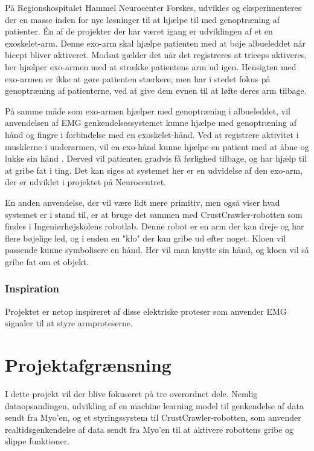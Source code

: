 På Regionshospitalet Hammel Neurocenter Forskes, udvikles og eksperimenteres der en masse inden for nye løsninger til at hjælpe til med genoptræning af patienter. Én af de projekter der har været igang er udviklingen af et en exoskelet-arm. Denne exo-arm skal hjælpe patienten med at bøje albueleddet når bicept bliver aktiveret. Modsat gælder det når det registreres at triceps aktiveres, her hjælper exo-armen med at strække patientens arm ud igen. Hensigten med exo-armen er ikke at gøre patienten stærkere, men har i stedet fokus på genoptræning af patienterne, ved at give dem evnen til at løfte deres arm tilbage.

På samme måde som exo-armen hjælper med genoptræning i albueleddet, vil anvendelsen af EMG genkendelsessystemet kunne hjælpe med genoptræning af hånd og fingre i forbindelse med en exoskelet-hånd. Ved at registrere aktivitet i musklerne i underarmen, vil en exo-hånd kunne hjælpe en patient med at åbne og lukke sin hånd . Derved vil patienten gradvis få førlighed tilbage, og har hjælp til at gribe fat i ting. Det kan siges at systemet her er en udvidelse af den exo-arm, der er udviklet i projektet på Neurocentret.

En anden anvendelse, der vil være lidt mere primitiv, men også viser hvad systemet er i stand til, er at bruge det sammen med CrustCrawler-robotten som findes i Ingeniørhøjskolens robotlab. Denne robot er en arm der kan dreje og har flere bøjelige led, og i enden en "klo" der kan gribe ud efter noget. Kloen vil passende kunne symbolisere en hånd. Her vil man knytte sin hånd, og kloen vil så gribe fat om et objekt.

\subsubsection{Inspiration}
Projektet er netop inspireret af disse elektriske proteser som anvender EMG signaler til at styre armproteserne.

\section{Projektafgrænsning}
\label{chp:projektafgensning}
I dette projekt vil der blive fokuseret på tre overordnet dele. Nemlig dataopsamlingen, udvikling af en machine learning model til genkendelse af data sendt fra Myo’en, og et styringssystem til CrustCrawler-robotten, som anvender realtidsgenkendelse af data sendt fra Myo’en til at aktivere robottens gribe og slippe funktioner. 

